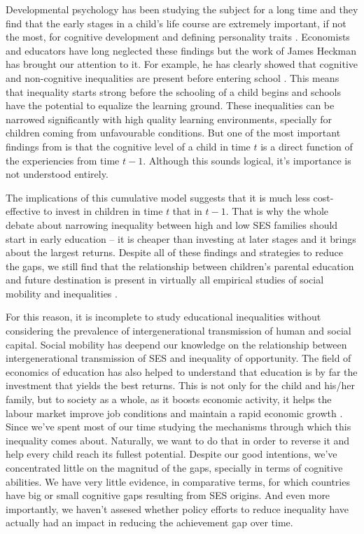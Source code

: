\documentclass[11pt, a4paper]{article}\usepackage[]{graphicx}\usepackage[]{color}
\begin{document}
Developmental psychology has been studying the subject for a long time and they find that the early stages in a child's life course are extremely important, if not the most, for cognitive development and defining personality traits \citep{duyme1999, waldfogel2006}. Economists and educators have long neglected these findings but the work of James Heckman has brought our attention to it. For example, he has clearly showed that cognitive and non-cognitive inequalities are present before entering school \citep{heckman2006}. This means that inequality starts strong before the schooling of a child begins and schools have the potential to equalize the learning ground. These inequalities can be narrowed significantly with high quality learning environments, specially for children coming from unfavourable conditions. But one of the most important findings from \citet{cunha2006} is that the cognitive level of a child in time \(t\) is a direct function of the experiencies from time \(t-1\). Although this sounds logical, it's importance is not understood entirely.

The implications of this cumulative model suggests that it is much less cost-effective to invest in children in time \(t\) that in \(t-1\). That is why the whole debate about narrowing inequality between high and low SES families should start in early education -- it is cheaper than investing at later stages and it brings about the largest returns. Despite all of these findings and strategies to reduce the gaps, we still find that the relationship between children's parental education and future destination is present in virtually all empirical studies of social mobility and inequalities \citep{breen1997, breen2007, waldfogel2006, bradbury2015, chetty2016}.

For this reason, it is incomplete to study educational inequalities without considering the prevalence of intergenerational transmission of human and social capital. Social mobility has deepend our knowledge on the relationship between intergenerational transmission of SES and inequality of opportunity. The field of economics of education has also helped to understand that education is by far the investment that yields the best returns. This is not only for the child and his/her family, but to society as a whole, as it boosts economic activity, it helps the labour market improve job conditions and maintain a rapid economic growth \citep{hanushek2007}. Since \citet{coleman1966} we've spent most of our time studying the mechanisms through which this inequality comes about. Naturally, we want to do that in order to reverse it and help every child reach its fullest potential. Despite our good intentions, we've concentrated little on the magnitud of the gaps, specially in terms of cognitive abilities. We have very little evidence, in comparative terms, for which countries have big or small cognitive gaps resulting from SES origins. And even more importantly, we haven't assesed whether policy efforts to reduce inequality have actually had an impact in reducing the achievement gap over time.
\end{document}
